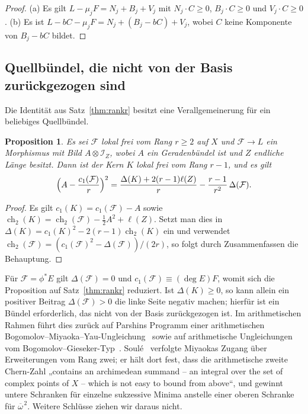 \documentclass[11pt]{article}
\newtheorem{proposition}[theorem]{Proposition}
\theoremstyle{definition}
\theoremstyle{remark}
\DeclareMathOperator{\ch}{ch}
\newcommand{\cI}{\mathcal{I}}
\newcommand{\cF}{\mathcal{F}}
\newcommand{\ob}{\overline{\omega}}
\begin{document}
\begin{proof}
(a) Es gilt $L-\mu_jF=N_j+B_j+V_j$ mit $N_j\cdot C\ge 0$, $B_j\cdot C\ge 0$ und
$V_j\cdot C\ge 0$. (b) Es ist $L-bC-\mu_jF=N_j+(B_j-bC)+V_j$, wobei $C$ keine
Komponente von $B_j-bC$ bildet.
\end{proof}

\subsection{Quellbündel, die nicht von der Basis zurückgezogen sind}
Die Identität aus Satz~\ref{thm:rankr} besitzt eine Verallgemeinerung für ein
beliebiges Quellbündel.

\begin{proposition}\label{prop:universal}
Es sei $\cF$ lokal frei vom Rang $r\ge 2$ auf $X$ und $\cF\to L$ ein Morphismus
mit Bild $A\otimes\cI_Z$, wobei $A$ ein Geradenbündel ist und $Z$ endliche Länge
besitzt. Dann ist der Kern $K$ lokal frei vom Rang $r-1$, und es gilt
\[
\Bigl(A-\frac{c_1(\cF)}{r}\Bigr)^2=\frac{\Delta(K)+2(r-1)\ell(Z)}{r}-\frac{r-1}{r^2}\,\Delta(\cF).
\]
\end{proposition}

\begin{proof}
Es gilt $c_1(K)=c_1(\cF)-A$ sowie $\ch_2(K)=\ch_2(\cF)-\frac12A^2+\ell(Z)$. Setzt
man dies in $\Delta(K)=c_1(K)^2-2(r-1)\ch_2(K)$ ein und verwendet
$\ch_2(\cF)=(c_1(\cF)^2-\Delta(\cF))/(2r)$, so folgt durch Zusammenfassen die
Behauptung.
\end{proof}

Für $\cF=\phi^*E$ gilt $\Delta(\cF)=0$ und $c_1(\cF)\equiv(\deg E)F$, womit sich
die Proposition auf Satz~\ref{thm:rankr} reduziert. Ist $\Delta(K)\ge 0$, so
kann allein ein positiver Beitrag $\Delta(\cF)>0$ die linke Seite negativ machen;
hierfür ist ein Bündel erforderlich, das nicht von der Basis zurückgezogen ist.
Im arithmetischen Rahmen führt dies zurück auf Parshins Programm einer
arithmetischen Bogomolov--Miyaoka--Yau-Ungleichung~\cite{Pa88,MB90} sowie auf
arithmetische Ungleichungen vom Bogomolov--Gieseker-Typ~\cite{Mo94}.
Soul\'e~\cite{So05} verfolgte Miyaokas Zugang über Erweiterungen vom Rang zwei;
er hält dort fest, dass die arithmetische zweite Chern-Zahl „contains an
archimedean summand -- an integral over the set of complex points of $X$ -- which
is not easy to bound from above“, und gewinnt untere Schranken für einzelne
sukzessive Minima anstelle einer oberen Schranke für $\ob^{\,2}$. Weitere
Schlüsse ziehen wir daraus nicht.
\end{document}
